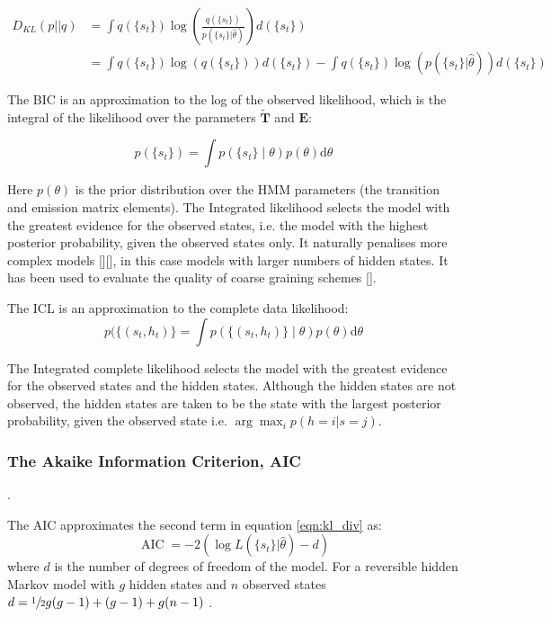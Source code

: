 \begin{equation}\label{eqn:kl_div}
\begin{split}
    D_{KL}(p||q) & = \int q(\{s_t\}) \log{\left(\frac{ q(\{s_t\}) }{p(\{s_t\} | \hat{\theta})}  \right)} d(\{s_t\}) \\ 
    & = \int q(\{s_t\}) \log{\left(q(\{s_t\})\right)}d(\{s_t\}) - \int q(\{s_t\})\log{\left(p(\{s_t\} | \hat{\theta})\right)} d(\{s_t\})
\end{split}
\end{equation}

The BIC is an approximation to the log of the observed likelihood, which is the integral of the likelihood over the parameters $\tilde{\mathbf{T}}$ and $\mathbf{E}$: 

\begin{equation}\label{eqn:obs_lik_int}
        p(\{s_t\}) = \int p\left(\{s_{t}\}\middle |\theta \right)p(\theta) \mathrm{d}\theta
\end{equation}

Here $p(\theta)$ is the prior distribution over the HMM parameters (the transition and emission matrix elements).  The Integrated likelihood selects the model with the greatest evidence for the observed states, i.e. the model with the highest posterior probability, given the observed states only. It naturally penalises more complex models [][], in this case models with larger numbers of hidden states. It has been used to evaluate the quality of coarse graining schemes []. 

The ICL is an approximation to the complete data likelihood: 
\begin{equation}\label{eqn:class_lik_int}
    p(\{(s_t, h_t)\} = \int p\left(\{(s_{t}, h_{t})\}\middle |\theta \right)p(\theta) \mathrm{d}\theta
\end{equation}

The Integrated complete likelihood selects the model with the greatest evidence for the observed states and the hidden states. Although the hidden states are not observed, the hidden states are  taken to be the state with the largest posterior probability, given the observed state i.e. $\arg\max_{i}p(h=i|s=j)$.  


\subsubsection{The Akaike Information Criterion, AIC}. 

The AIC approximates the second term in equation \ref{eqn:kl_div} as:
\begin{equation}\label{eqn:aic}
    \operatorname{AIC} = -2\left(\log{L\left(\{s_t\}|\hat{\theta}\right)} - d\right)
\end{equation}
where $d$ is the number of degrees of freedom of the model. For a reversible hidden Markov model with $g$ hidden states and $n$ observed states  $d = \sfrac{1}{2}g(g-1) + (g-1) + g(n-1)$ \cite{trendelkamp-schroerEstimationUncertaintyReversible2015b}. 


